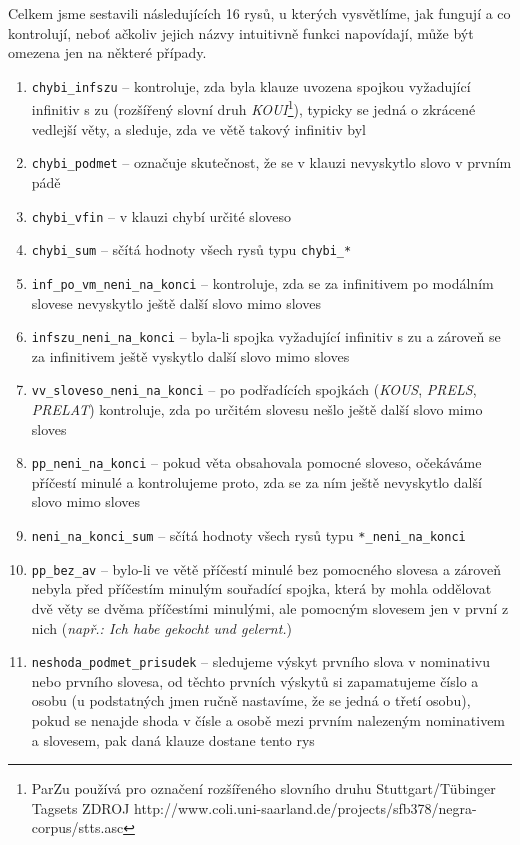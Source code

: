 \documentclass[12pt,a4paper]{report}
\begin{document}
Celkem jsme sestavili následujících 16 rysů, u kterých vysvětlíme, jak fungují a co kontrolují, neboť ačkoliv jejich názvy intuitivně funkci napovídají, může být omezena jen na některé případy.
\begin{enumerate}
\item{\texttt{chybi\_infszu} -- kontroluje, zda byla klauze uvozena spojkou vyžadující infinitiv s zu (rozšířený slovní druh \textit{KOUI}\footnote{ParZu používá pro označení rozšířeného slovního druhu Stuttgart/Tübinger Tagsets ZDROJ http://www.coli.uni-saarland.de/projects/sfb378/negra-corpus/stts.asc}), typicky se jedná o zkrácené vedlejší věty, a sleduje, zda ve větě takový infinitiv byl}
\item{\texttt{chybi\_podmet} -- označuje skutečnost, že se v klauzi nevyskytlo slovo v prvním pádě}
\item{\texttt{chybi\_vfin} -- v klauzi chybí určité sloveso}
\item{\texttt{chybi\_sum} -- sčítá hodnoty všech rysů typu \texttt{chybi\_*}}
\item{\texttt{inf\_po\_vm\_neni\_na\_konci} -- kontroluje, zda se za infinitivem po modálním slovese nevyskytlo ještě další slovo mimo sloves}
\item{\texttt{infszu\_neni\_na\_konci} -- byla-li spojka vyžadující infinitiv s zu a zároveň se za infinitivem ještě vyskytlo další slovo mimo sloves}
\item{\texttt{vv\_sloveso\_neni\_na\_konci} -- po podřadících spojkách (\textit{KOUS}, \textit{PRELS}, \textit{PRELAT}) kontroluje, zda po určitém slovesu nešlo ještě další slovo mimo sloves}
\item{\texttt{pp\_neni\_na\_konci} -- pokud věta obsahovala pomocné sloveso, očekáváme příčestí minulé a kontrolujeme proto, zda se za ním ještě nevyskytlo další slovo mimo sloves}
\item{\texttt{neni\_na\_konci\_sum} -- sčítá hodnoty všech rysů typu \texttt{*\_neni\_na\_konci}}
\item{\texttt{pp\_bez\_av} -- bylo-li ve větě příčestí minulé bez pomocného slovesa a zároveň nebyla před příčestím minulým souřadící spojka, která by mohla oddělovat dvě věty se dvěma příčestími minulými, ale pomocným slovesem jen v první z nich (\textit{např.: Ich habe gekocht und gelernt.})}
\item{\texttt{neshoda\_podmet\_prisudek} -- sledujeme výskyt prvního slova v nominativu nebo prvního slovesa, od těchto prvních výskytů si zapamatujeme číslo a osobu (u podstatných jmen ručně nastavíme, že se jedná o třetí osobu), pokud se nenajde shoda v čísle a osobě mezi prvním nalezeným nominativem a slovesem, pak daná klauze dostane tento rys}

\end{enumerate}
\end{document}
